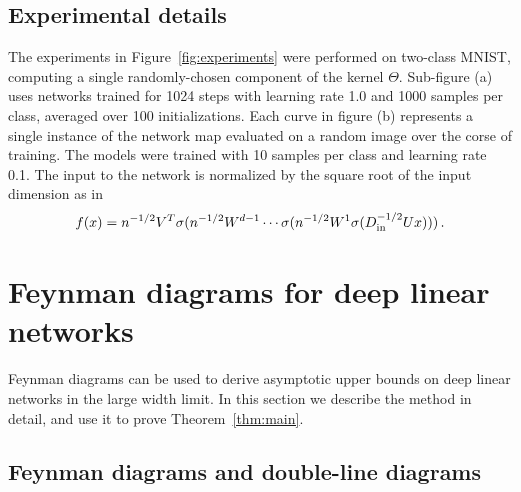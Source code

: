 \documentclass[english]{article}
\newcommand{\es}[2] {\begin{align} \label{#1} #2 \end{align}}
\newcommand{\pcite}[1]{\cite{#1}}
\begin{document}
\subsection{Experimental details}

The experiments in Figure~\ref{fig:experiments} were performed on two-class MNIST, computing a single randomly-chosen component of the kernel $\Theta$.
Sub-figure (a) uses networks trained for 1024 steps with learning rate 1.0 and 1000 samples per class, averaged over 100 initializations.
Each curve in figure (b) represents a single instance of the network map evaluated on a random image over the corse of training. The models were trained with 10 samples per class and learning rate 0.1. The input to the network is normalized by the square root of the input dimension as in \pcite{ntk}
\es{norm}{
f(x) = n^{-1/2} V^T \sigma(n^{-1/2} W^{d-1} \cdots \sigma(n^{-1/2} W^1 \sigma(D_{\rm in}^{-1/2}U x)))\,.
}

\section{Feynman diagrams for deep linear networks}\label{app:deep_linear_fd}

Feynman diagrams can be used to derive asymptotic upper bounds on deep linear networks in the large width limit.
In this section we describe the method in detail, and use it to prove Theorem~\ref{thm:main}.

\subsection{Feynman diagrams and double-line diagrams}
\label{sec:dn}
\end{document}

